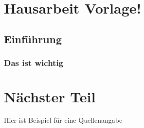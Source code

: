 \section{Hausarbeit Vorlage!}
\blindtext
\subsection{Einführung}
\blindtext
\subsubsection{Das ist wichtig}
\blindtext
\section{Nächster Teil}
Hier ist Beispiel für eine Quellenangabe \autocite{test}

\blindtext